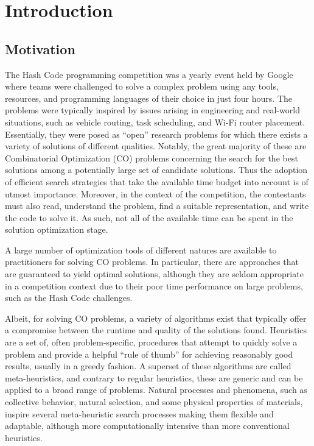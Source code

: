 \chapter{Introduction}
\label{chapter:introduction}

\section{Motivation}
\label{section:motivation}

The Hash Code programming competition was a yearly event held by Google where
teams were challenged to solve a complex problem using any tools, resources, and
programming languages of their choice in just four hours. The problems were
typically inspired by issues arising in engineering and real-world situations,
such as vehicle routing, task scheduling, and Wi-Fi router placement.
Essentially, they were posed as ``open'' research problems for which there
exists a variety of solutions of different qualities. Notably, the great
majority of these are Combinatorial Optimization (CO) problems concerning the
search for the best solutions among a potentially large set of candidate
solutions. Thus the adoption of efficient search strategies that take the
available time budget into account is of utmost importance. Moreover, in the
context of the competition, the contestants must also read, understand the
problem, find a suitable representation, and write the code to solve it. As
such, not all of the available time can be spent in the solution optimization
stage.

A large number of optimization tools of different natures are available to
practitioners for solving CO problems. In particular, there are approaches that
are guaranteed to yield optimal solutions, although they are seldom appropriate
in a competition context due to their poor time performance on large problems,
such as the Hash Code challenges.

Albeit, for solving CO problems, a variety of algorithms exist that
typically offer a compromise between the runtime and quality of the solutions
found. Heuristics are a set of, often problem-specific, procedures that attempt
to quickly solve a problem and provide a helpful ``rule of thumb'' for
achieving reasonably good results, usually in a greedy fashion. A superset of
these algorithms are called meta-heuristics, and contrary to regular heuristics,
these are generic and can be applied to a broad range of problems. Natural
processes and phenomena, such as collective behavior, natural selection, and
some physical properties of materials, inspire several meta-heuristic search
processes making them flexible and adaptable, although more computationally
intensive than more conventional heuristics.

